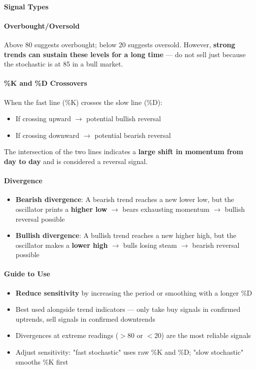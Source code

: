 \documentclass[12pt,openany]{book}
\begin{document}
\paragraph{Signal Types}

\paragraph{Overbought/Oversold}
Above 80 suggests overbought; below 20 suggests oversold. However, \textbf{strong trends can sustain these levels for a long time} --- do not sell just because the stochastic is at 85 in a bull market.

\paragraph{\%K and \%D Crossovers}
When the fast line (\%K) crosses the slow line (\%D):
\begin{itemize}[leftmargin=*]
    \item If crossing upward \(\rightarrow\) potential bullish reversal
    \item If crossing downward \(\rightarrow\) potential bearish reversal
\end{itemize}

The intersection of the two lines indicates a \textbf{large shift in momentum from day to day} and is considered a reversal signal.

\paragraph{Divergence}
\begin{itemize}[leftmargin=*]
    \item \textbf{Bearish divergence}: A bearish trend reaches a new lower low, but the oscillator prints a \textbf{higher low} \(\rightarrow\) bears exhausting momentum \(\rightarrow\) bullish reversal possible
    \item \textbf{Bullish divergence}: A bullish trend reaches a new higher high, but the oscillator makes a \textbf{lower high} \(\rightarrow\) bulls losing steam \(\rightarrow\) bearish reversal possible
\end{itemize}

\paragraph{Guide to Use}
\begin{itemize}[leftmargin=*]
    \item \textbf{Reduce sensitivity} by increasing the period or smoothing with a longer \%D
    \item Best used alongside trend indicators --- only take buy signals in confirmed uptrends, sell signals in confirmed downtrends
    \item Divergences at extreme readings (\(>\)80 or \(<\)20) are the most reliable signals
    \item Adjust sensitivity: "fast stochastic" uses raw \%K and \%D; "slow stochastic" smooths \%K first
\end{itemize}
\end{document}
